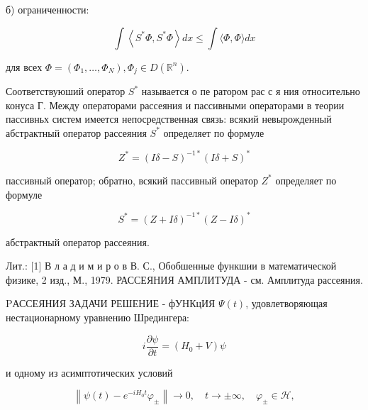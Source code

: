 \documentclass[10pt]{article}
\begin{document}
б) ограниченности:



\[

\int\left\langle S^{*} \Phi, S^{*} \Phi\right\rangle d x \leqslant \int\langle\Phi, \Phi\rangle d x

\]



для всех $\Phi=\left(\Phi_{1}, \ldots, \Phi_{N}\right), \Phi_{j} \in D\left(\mathbb{R}^{n}\right)$.



Соответствуюший оператор $S^{*}$ называется о пе ратором рас с я ния относительно конуса Г. Между операторами рассеяния и пассивными операторами в теории пассивньх систем имеется непосредственная связь: всякий невырожденный абстрактный оператор рассеяния $S^{*}$ определяет по формуле



\[

Z^{*}=(I \delta-S)^{-1 *}(I \delta+S)^{*}

\]



пассивный оператор; обратно, всякий пассивный оператор $Z^{*}$ определяет по формуле



\[

S^{*}=(Z+I \delta)^{-1 *}(Z-I \delta)^{*}

\]



абстрактный оператор рассеяния.



Лит.: [1] В л а д и м и р о в В. С., Обобшенные функшии в математической физике, 2 изд., М., 1979. РАССЕЯНИЯ АМПЛИТУДА - см. Амплитуда рассеяния.



PАССЕЯНИЯ ЗАДАЧИ РЕШЕНИЕ - фУНКцИЯ $\Psi(t)$, удовлетворяющая нестационарному уравнению Шредингера:



\[

i \frac{\partial \psi}{\partial t}=\left(H_{0}+V\right) \psi

\]



и одному из асимптотических условий



\[

\left\|\psi(t)-e^{-i H_{0} t} \varphi_{ \pm}\right\| \rightarrow 0, \quad t \rightarrow \pm \infty, \quad \varphi_{ \pm} \in \mathscr{H},

\]
\end{document}
